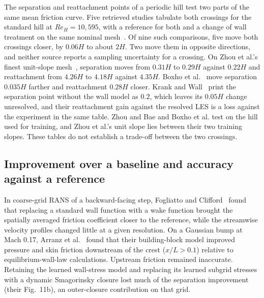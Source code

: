 \documentclass[pdflatex,sn-nature,iicol]{sn-jnl}
\begin{document}
The separation and reattachment points of a periodic hill test two parts of the same mean friction curve. Five retrieved studies tabulate both crossings for the standard hill at $Re_H=10{,}595$, with a reference for both and a change of wall treatment on the same nominal mesh~\cite{Krank2016,Krank2018,ZhouFEL2025,DiZhou2024,Boxho2025}. Of nine such comparisons, five move both crossings closer, by $0.06H$ to about $2H$. Two move them in opposite directions, and neither source reports a sampling uncertainty for a crossing. On Zhou et al.'s finest unit-slope mesh~\cite{ZhouFEL2025}, separation moves from $0.31H$ to $0.29H$ against $0.22H$ and reattachment from $4.26H$ to $4.18H$ against $4.35H$. Boxho et al.~\cite{Boxho2025} move separation $0.035H$ farther and reattachment $0.28H$ closer. Krank and Wall~\cite{Krank2016} print the separation point without the wall model as $0.2$, which leaves its $0.05H$ change unresolved, and their reattachment gain against the resolved LES is a loss against the experiment in the same table. Zhou and Bae and Boxho et al. test on the hill used for training, and Zhou et al.'s unit slope lies between their two training slopes. These tables do not establish a trade-off between the two crossings.

\subsection{Improvement over a baseline and accuracy against a reference}\label{sec:comparison}
In coarse-grid RANS of a backward-facing step, Fogliatto and Clifford~\cite{Fogliatto2024} found that replacing a standard wall function with a wake function brought the spatially averaged friction coefficient closer to the reference, while the streamwise velocity profiles changed little at a given resolution. On a Gaussian bump at Mach 0.17, Arranz et al.~\cite{Arranz2024} found that their building-block model improved pressure and skin friction downstream of the crest ($x/L>0.1$) relative to equilibrium-wall-law calculations. Upstream friction remained inaccurate. Retaining the learned wall-stress model and replacing its learned subgrid stresses with a dynamic Smagorinsky closure lost much of the separation improvement (their Fig.~11b), an outer-closure contribution on that grid.
\end{document}
